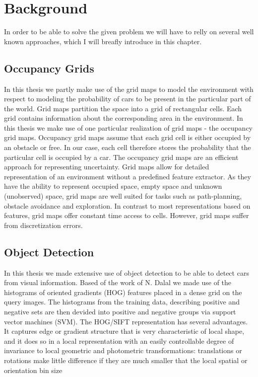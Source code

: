 \chapter{Background} %
\label{cha:background}
In order to be able to solve the given problem we will have to relly on several
well known approaches, which I will breafly introduce in this chapter.
\section{Occupancy Grids}
\label{sec:occupancy_grids}
In this thesis we partly make use of the grid maps to model the environment with
respect to modeling the probability of cars to be present in the particular part
of the world. Grid maps partition the space into a grid of rectangular cells.
Each grid contains information about the corresponding area in the environment.
In this thesis we make use of one particular realization of grid maps - the
occupancy grid maps. 
Occupancy grid maps assume that each grid cell is either occupied by an obstacle
or free. In our case, each cell therefore stores the probability that the particular 
cell is occupied by a car.
The occupancy grid maps are an efficient approach for representing uncertainty.
Grid maps allow for detailed representation of an environment without a
predefined feature extractor. As they have the ability to represent occupied
space, empty space and unknown (unobserved) space, grid maps are well suited for
tasks such as path-planning, obstacle avoidance and exploration. In contrast to
most representations based on features, grid maps offer constant time access to
cells. However, grid maps suffer from discretization errors.

\section{Object Detection}
\label{sec:object_detection}
In this thesis we made extensive use of object detection to be able to detect
cars from visual information. Based of the work of N. Dalal we made use of the
histograms of oriented gradients (HOG) features placed in a dense grid on the
query images. The histograms from the training data, describing positive and
negative sets are then devided into positive and negative groups via support
vector machines (SVM).
The HOG/SIFT representation has several advantages. It
captures edge or gradient structure that is very characteristic
of local shape, and it does so in a local representation with
an easily controllable degree of invariance to local geometric
and photometric transformations: translations or rotations
make little difference if they are much smaller that the local
spatial or orientation bin size


